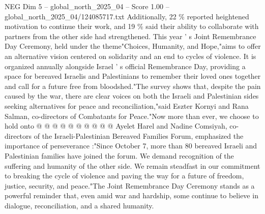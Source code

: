 \begin{textsample}{NEG Dim 5 – global\_north\_2025\_04 – Score 1.00 – global\_north\_2025\_04/124085717.txt}
Additionally, 22 \% reported heightened motivation to continue their work, and 19 \% said their ability to collaborate with partners from the other side had strengthened.
This year ' s Joint Remembrance Day Ceremony, held under the theme"Choices, Humanity, and Hope,"aims to offer an alternative vision centered on solidarity and an end to cycles of violence.
It is organized annually alongside Israel ' s official Remembrance Day, providing a space for bereaved Israelis and Palestinians to remember their loved ones together and call for a future free from bloodshed."The survey shows that, despite the pain caused by the war, there are clear voices on both the Israeli and Palestinian sides seeking alternatives for peace and reconciliation,"said Eszter Kornyi and Rana Salman, co-directors of Combatants for Peace."Now more than ever, we choose to hold onto @ @ @ @ @ @ @ @ @ @ Ayelet Harel and Nadine Comsiyah, co-directors of the Israeli-Palestinian Bereaved Families Forum, emphasized the importance of perseverance :"Since October 7, more than 80 bereaved Israeli and Palestinian families have joined the forum.
We demand recognition of the suffering and humanity of the other side.
We remain steadfast in our commitment to breaking the cycle of violence and paving the way for a future of freedom, justice, security, and peace."The Joint Remembrance Day Ceremony stands as a powerful reminder that, even amid war and hardship, some continue to believe in dialogue, reconciliation, and a shared humanity.

\end{textsample}
